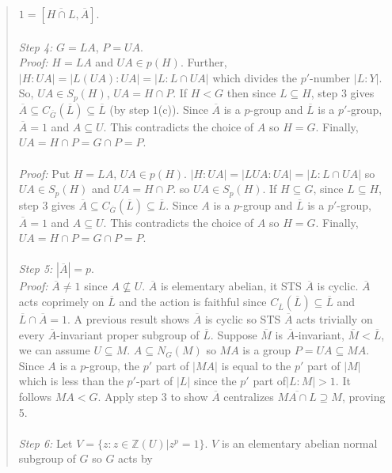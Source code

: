 \begin{quote}
$1 = [{\overline {H \cap L}}, {\overline {A}}]$.
\\
\\
\emph{Step 4:} $G = LA$, $P=UA$.\\
\emph{Proof:}  $H=LA$ and $UA \in p(H)$.  Further,  $|H:UA|= |L(UA):UA| = |L:L \cap UA|$ which divides the $p'$-number
$|L:Y|$.  So, $UA \in S_p(H)$, $UA = H \cap P$.  
If $H < G$
then since $L \subseteq H$, step 3 gives 
${\overline A} \subseteq C_{\overline G}({\overline L}) \subseteq {\overline L}$ (by step 1(c)).  Since ${\overline A}$ is
a $p$-group and ${\overline L}$ is a $p'$-group, ${\overline A} = 1$ and $A \subseteq U$.  This contradicts the choice of $A$
so $H = G$.  Finally, $UA = H \cap P = G \cap P = P$.
\\
\\
\emph{Proof:} Put $H=LA$, $UA \in p(H)$.  $|H:UA| = |LUA:UA|= |L:L \cap UA|$ so $UA \in S_p(H)$ and
$UA = H \cap P$.
so $UA \in S_p(H)$.  If $H \subseteq G$, since $L \subseteq H$, step 3 gives
${\overline A} \subseteq C_{{\overline G}}({\overline L}) \subseteq {\overline L}$.  Since
$A$ is a $p$-group and ${\overline L}$ is a $p'$-group, ${\overline A} =1$ and $A \subseteq U$.
This contradicts the choice of $A$ so $H=G$.  Finally, $UA = H \cap P = G \cap P = P$.
\\
\\
\emph{Step 5:} $|{\overline A}| = p$.\\
\emph{Proof:}  
${\overline A} \ne 1$ since $A \not\subseteq U$.  ${\overline A}$ is elementary abelian, it STS ${\overline A}$ is cyclic.
${\overline A}$ acts coprimely on ${\overline L}$ and the action is faithful since $C_{\overline L}({\overline L}) \subseteq {\overline L}$
and ${\overline L} \cap {\overline A} = 1$.  A previous result shows ${\overline A}$ is cyclic so STS ${\overline A}$ acts trivially
on every ${\overline A}$-invariant proper subgroup of ${\overline L}$.
Suppose
${\overline M}$ is ${\overline A}$-invariant, ${\overline M} < {\overline L}$, we can assume
$U \subseteq M$. $A \subseteq N_G(M)$ so $MA$ is a group $P = UA \subseteq MA$.  Since $A$ is a $p$-group,
the $p'$ part of $|MA|$ is equal to the
$p'$ part of $|M|$ which is less than the $p'$-part of $|L|$ since
the $p'$ part of$|L:M| >1$.
It follows $MA < G$.  Apply step 3 to show ${\overline A}$ centralizes
${\overline {MA \cap L}} \supseteq M$, proving 5.
\\
\\
\emph{Step 6:}  Let $V= \{ z: z \in {\mathbb Z}(U) | z^p = 1\}$.  $V$ is an elementary abelian normal subgroup of $G$ so $G$ acts by

\end{quote}
